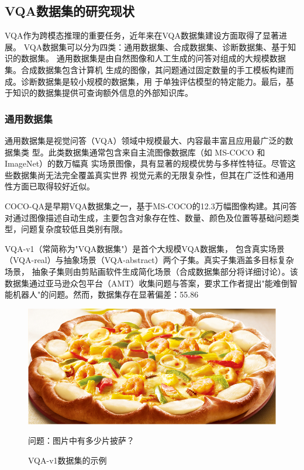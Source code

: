 \subsection{VQA数据集的研究现状}
VQA作为跨模态推理的重要任务，近年来在VQA数据集建设方面取得了显著进展。
VQA数据集可以分为四类：通用数据集、合成数据集、诊断数据集、基于知识的数据集。
通用数据集是由自然图像和人工生成的问答对组成的大规模数据集。合成数据集包含计算机
生成的图像，其问题通过固定数量的手工模板构建而成。诊断数据集是较小规模的数据集，用
于单独评估模型的特定能力。最后，基于知识的数据集提供可查询额外信息的外部知识库。
\subsubsection{通用数据集}
通用数据集是视觉问答（VQA）领域中规模最大、内容最丰富且应用最广泛的数据集类
型。此类数据集通常包含来自主流图像数据库（如 MS-COCO\cite{lin2014microsoft} 和 ImageNet\cite{deng2009imagenet}）的数万幅真
实场景图像，具有显著的规模优势与多样性特征。尽管这些数据集尚无法完全覆盖真实世界
视觉元素的无限复杂性，但其在广泛性和通用性方面已取得较好近似。

COCO-QA是早期VQA数据集之一，基于MS-COCO的12.3万幅图像构建。其问答对通过图像描述自动生成，主要包含对象存在性、数量、颜色及位置等基础问题类型，问题复杂度较低且类别有限。

VQA-v1\cite{Antol2015VQA}（常简称为"VQA数据集"）是首个大规模VQA数据集，
包含真实场景（VQA-real）与抽象场景（VQA-abstract）两个子集。真实子集涵盖多目标复杂场景，
抽象子集则由剪贴画软件生成简化场景（合成数据集部分将详细讨论）。该数据集通过亚马逊众包平台（AMT）收集问题与答案，要求工作者提出"能难倒智能机器人"的问题。然而，数据集存在显著偏差：55.86%
\begin{figure}[h]
    \centering
    \includegraphics[scale=0.4]{figures/example-from-vqa-v1.jpg}
    \begin{center}
        \footnotesize 问题：图片中有多少片披萨？
    \end{center}
    \caption{VQA-v1数据集的示例}
    \label{fig:example-from-vqa-v1}
\end{figure}

